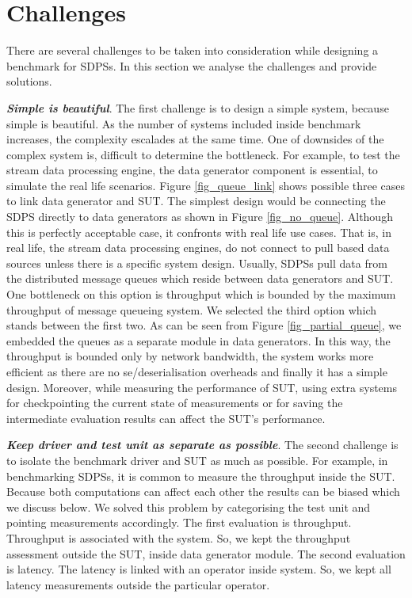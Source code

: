 \documentclass{vldb}
\begin{document}
\section{Challenges}
There are several challenges to be taken into consideration while designing a benchmark for SDPSs. In this section we analyse the challenges and provide solutions.

\textbf{ \textit{Simple is beautiful}}. The first challenge is to design a simple system, because simple is beautiful. As the number of systems included inside benchmark increases, the complexity escalades at the same time. One of downsides of the complex system is, difficult to determine the bottleneck. For example, to test the stream data processing engine, the data generator component is essential, to simulate the real life scenarios. Figure \ref{fig_queue_link} shows possible three cases to link data generator and SUT. The simplest design would be connecting the SDPS directly to data generators as shown in Figure \ref{fig_no_queue}. Although this is perfectly acceptable case, it confronts with real life use cases. That is,  in real life, the stream data processing engines, do not connect to pull based data sources unless there is a specific system design. Usually, SDPSs pull data from the distributed message queues which reside between data generators and SUT. One bottleneck on this option is throughput which is bounded by the maximum throughput of message queueing system. We selected the third option which stands between the first two. As can be seen from Figure \ref{fig_partial_queue}, we embedded the queues as a separate module in data generators. In this way, the throughput is bounded only by network bandwidth, the system works more efficient as there are no se/deserialisation overheads and finally it has a simple design. Moreover, while measuring the performance of SUT, using extra systems for checkpointing the current state of measurements or for saving the intermediate evaluation results can affect the SUT's performance.


\textbf{ \textit{Keep driver and test unit as separate as possible}}. The second challenge is to isolate the benchmark driver and SUT as much as possible. For example, in benchmarking SDPSs, it is common to measure the throughput inside the SUT. Because both computations can affect each other the results can be  biased  which we discuss below. We solved this problem by categorising the test unit and pointing measurements accordingly. The first evaluation is throughput. Throughput is associated with the system. So, we kept the throughput assessment outside the SUT, inside data generator module. The second evaluation is latency. The latency is linked with an operator inside system. So, we kept all latency measurements outside the particular operator.
\end{document}
